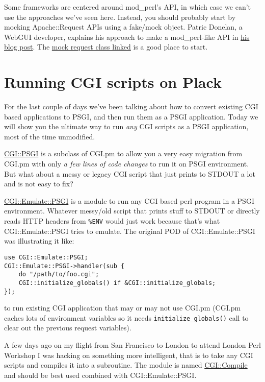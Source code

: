 Some frameworks are centered around mod\_perl's API, in which case we
can't use the approaches we've seen here. Instead, you should probably
start by mocking Apache::Request APIs using a fake/mock object. Patric
Donelan, a WebGUI developer, explains his approach to make a
mod\_perl-like API in
\href{http://blog.patspam.com/2009/plack-roundup-at-sf-pm}{his blog
post}. The
\href{http://github.com/pdonelan/webgui/blob/plebgui/lib/WebGUI/Session/Plack.pm}{mock
request class linked} is a good place to start.

\chapter{Running CGI scripts on
Plack}\label{day-9-running-cgi-scripts-on-plack}

For the last couple of days we've been talking about how to convert
existing CGI based applications to PSGI, and then run them as a PSGI
application. Today we will show you the ultimate way to run \emph{any}
CGI scripts as a PSGI application, most of the time unmodified.

\href{http://search.cpan.org/perldoc?CGI::PSGI}{CGI::PSGI} is a subclass
of CGI.pm to allow you a very easy migration from CGI.pm with only
\emph{a few lines of code changes} to run it on PSGI environment. But
what about a messy or legacy CGI script that just prints to STDOUT a lot
and is not easy to fix?

\href{http://search.cpan.org/perldoc?CGI::Emulate::PSGI}{CGI::Emulate::PSGI}
is a module to run any CGI based perl program in a PSGI environment.
Whatever messy/old script that prints stuff to STDOUT or directly reads
HTTP headers from \lstinline!%ENV! would just work because that's what
CGI::Emulate::PSGI tries to emulate. The original POD of
CGI::Emulate::PSGI was illustrating it like:

\begin{lstlisting}
use CGI::Emulate::PSGI;
CGI::Emulate::PSGI->handler(sub {
    do "/path/to/foo.cgi";
    CGI::initialize_globals() if &CGI::initialize_globals;
});
\end{lstlisting}

to run existing CGI application that may or may not use CGI.pm (CGI.pm
caches lots of environment variables so it needs
\lstinline!initialize_globals()! call to clear out the previous request
variables).

A few days ago on my flight from San Francisco to London to attend
London Perl Workshop I was hacking on something more intelligent, that
is to take any CGI scripts and compiles it into a subroutine. The module
is named
\href{http://search.cpan.org/perldoc?CGI::Compile}{CGI::Compile} and
should be best used combined with CGI::Emulate::PSGI.

